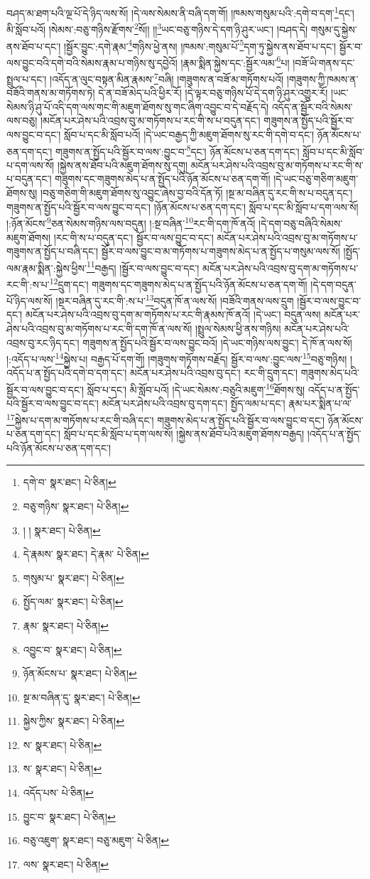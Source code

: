 བཤད་མ་ཐག་པའི་ལྔ་པོ་དེ་ཉིད་ལས་སོ། །དེ་ལས་སེམས་ནི་བཞི་དག་གོ། །ཁམས་གསུམ་པའི་:དགེ་བ་དག་\footnote{དགེ་བ་  སྣར་ཐང་།  པེ་ཅིན། }དང་། མི་སློབ་པའོ། །སེམས་:བཅུ་གཉིས་རྫོགས་\footnote{བཅུ་གཉིས་  སྣར་ཐང་།  པེ་ཅིན། }སོ།། །།\footnote{། །  སྣར་ཐང་།  པེ་ཅིན། }ཡང་བཅུ་གཉིས་དེ་དག་ཉི་ཤུར་ཡང་། །བཤད་དེ། གསུམ་དུ་སྐྱེས་ནས་ཐོབ་པ་དང་། །སྦྱོར་བྱུང་:དགེ་རྣམ་\footnote{དེ་རྣམས་  སྣར་ཐང་། དེ་རྣམ་  པེ་ཅིན། }གཉིས་ཕྱེ་ནས། །ཁམས་:གསུམ་པོ་\footnote{གསུམ་པ་  སྣར་ཐང་།  པེ་ཅིན། }དག་ཏུ་སྐྱེས་ནས་ཐོབ་པ་དང་། སྦྱོར་བ་ལས་བྱུང་བའི་དགེ་བའི་སེམས་རྣམ་པ་གཉིས་སུ་དབྱེའོ། །རྣམ་སྨིན་སྐྱེས་དང་:སྦྱོར་ལམ་\footnote{སྤྱོད་ལམ་  སྣར་ཐང་།  པེ་ཅིན། }པ། །བཟོ་ཡི་གནས་དང་སྤྲུལ་པ་དང་། །འདོད་ན་ལུང་བསྟན་མིན་རྣམས་\footnote{རྣམ་  སྣར་ཐང་།  པེ་ཅིན། }བཞི། །གཟུགས་ན་བཟོ་མ་གཏོགས་པའོ། །གཟུགས་ཀྱི་ཁམས་ན་བཟོའི་གནས་མ་གཏོགས་ཏེ། དེ་ན་བཟོ་མེད་པའི་ཕྱིར་རོ། །དེ་ལྟར་བཅུ་གཉིས་པོ་དེ་དག་ཉི་ཤུར་འགྱུར་རོ། །ཡང་སེམས་ཉི་ཤུ་པོ་འདི་དག་ལས་གང་གི་མཇུག་ཐོགས་སུ་གང་ཞིག་འབྱུང་བ་དེ་བརྗོད་དེ། འདོད་ན་སྦྱོར་བའི་སེམས་ལས་བཅུ། །མངོན་པར་ཤེས་པའི་འབྲས་བུ་མ་གཏོགས་པ་རང་གི་ས་པ་བདུན་དང་། གཟུགས་ན་སྤྱོད་པའི་སྦྱོར་བ་ལས་བྱུང་བ་དང་། སློབ་པ་དང་མི་སློབ་པའོ། །དེ་ཡང་བརྒྱད་ཀྱི་མཇུག་ཐོགས་སུ་རང་གི་དགེ་བ་དང་། ཉོན་མོངས་པ་ཅན་དག་དང་། གཟུགས་ན་སྤྱོད་པའི་སྦྱོར་བ་ལས་:བྱུང་བ་\footnote{འབྱུང་བ་  སྣར་ཐང་།  པེ་ཅིན། }དང་། ཉོན་མོངས་པ་ཅན་དག་དང་། སློབ་པ་དང་མི་སློབ་པ་དག་ལས་སོ། །སྐྱེས་ནས་ཐོབ་པའི་མཇུག་ཐོགས་སུ་དགུ། མངོན་པར་ཤེས་པའི་འབྲས་བུ་མ་གཏོགས་པ་རང་གི་ས་པ་བདུན་དང་། གཟུགས་དང་གཟུགས་མེད་པ་ན་སྤྱོད་པའི་ཉོན་མོངས་པ་ཅན་དག་གོ། །དེ་ཡང་བཅུ་གཅིག་མཇུག་ཐོགས་སུ། །བཅུ་གཅིག་གི་མཇུག་ཐོགས་སུ་འབྱུང་ཞེས་བྱ་བའི་དོན་ཏོ། །སྔ་མ་བཞིན་དུ་རང་གི་ས་པ་བདུན་དང་། གཟུགས་ན་སྤྱོད་པའི་སྦྱོར་བ་ལས་བྱུང་བ་དང་། །ཉོན་མོངས་པ་ཅན་དག་དང་། སློབ་པ་དང་མི་སློབ་པ་དག་ལས་སོ། །:ཉོན་མོངས་\footnote{ཉོན་མོངས་པ་  སྣར་ཐང་།  པེ་ཅིན། }ཅན་སེམས་གཉིས་ལས་བདུན། །:སྔ་བཞིན་\footnote{སྔ་མ་བཞིན་དུ་  སྣར་ཐང་།  པེ་ཅིན། }རང་གི་དག་ཁོ་ནའོ། །དེ་དག་བཅུ་བཞིའི་སེམས་མཇུག་ཐོགས། །རང་གི་ས་པ་བདུན་དང་། སྦྱོར་བ་ལས་བྱུང་བ་དང་། མངོན་པར་ཤེས་པའི་འབྲས་བུ་མ་གཏོགས་པ་གཟུགས་ན་སྤྱོད་པ་བཞི་དང་། སྦྱོར་བ་ལས་བྱུང་བ་མ་གཏོགས་པ་གཟུགས་མེད་པ་ན་སྤྱོད་པ་གསུམ་ལས་སོ། །སྤྱོད་ལམ་རྣམ་སྨིན་:སྐྱེས་ཕྱིས་\footnote{སྐྱེས་ཀྱིས་  སྣར་ཐང་།  པེ་ཅིན། }བརྒྱད། །སྦྱོར་བ་ལས་བྱུང་བ་དང་། མངོན་པར་ཤེས་པའི་འབྲས་བུ་དག་མ་གཏོགས་པ་རང་གི་:ས་པ་\footnote{ས་  སྣར་ཐང་།  པེ་ཅིན། }དྲུག་དང་། གཟུགས་དང་གཟུགས་མེད་པ་ན་སྤྱོད་པའི་ཉོན་མོངས་པ་ཅན་དག་གོ། །དེ་དག་བདུན་པོ་ཉིད་ལས་སོ། །སྔར་བཞིན་དུ་རང་གི་:ས་པ་\footnote{ས་  སྣར་ཐང་།  པེ་ཅིན། }བདུན་ཁོ་ན་ལས་སོ། །བཟོའི་གནས་ལས་དྲུག །སྦྱོར་བ་ལས་བྱུང་བ་དང་། མངོན་པར་ཤེས་པའི་འབྲས་བུ་དག་མ་གཏོགས་པ་རང་གི་རྣམས་ཁོ་ནའོ། །དེ་ཡང་། བདུན་ལས། མངོན་པར་ཤེས་པའི་འབྲས་བུ་མ་གཏོགས་པ་རང་གི་དག་ཁོ་ན་ལས་སོ། །སྤྲུལ་སེམས་ཕྱི་ནས་གཉིས། མངོན་པར་ཤེས་པའི་འབྲས་བུ་རང་ཉིད་དང་། གཟུགས་ན་སྤྱོད་པའི་སྦྱོར་བ་ལས་བྱུང་བའོ། །དེ་ཡང་གཉིས་ལས་བྱུང་། དེ་ཁོ་ན་ལས་སོ། །:འདོད་པ་ལས་\footnote{འདོད་པས་  པེ་ཅིན། }སྐྱེས་པ། བརྒྱད་པོ་དག་གོ། །གཟུགས་གཏོགས་བརྗོད། སྦྱོར་བ་ལས་:བྱུང་ལས་\footnote{བྱུང་བ་  སྣར་ཐང་།  པེ་ཅིན། }བཅུ་གཉིས། །འདོད་པ་ན་སྤྱོད་པའི་དགེ་བ་དག་དང་། མངོན་པར་ཤེས་པའི་འབྲས་བུ་དང་། རང་གི་དྲུག་དང་། གཟུགས་མེད་པའི་སྦྱོར་བ་ལས་བྱུང་བ་དང་། སློབ་པ་དང་། མི་སློབ་པའོ། །དེ་ཡང་སེམས་:བཅུའི་མཇུག་\footnote{བཅུ་འཇུག་  སྣར་ཐང་། བཅུ་མཇུག་  པེ་ཅིན། }ཐོགས་སུ། འདོད་པ་ན་སྤྱོད་པའི་སྦྱོར་བ་ལས་བྱུང་བ་དང་། མངོན་པར་ཤེས་པའི་འབྲས་བུ་དག་དང་། སྤྱོད་ལམ་པ་དང་། རྣམ་པར་སྨིན་པ་ལ་\footnote{ལས་  སྣར་ཐང་།  པེ་ཅིན། }སྐྱེས་པ་དག་མ་གཏོགས་པ་རང་གི་བཞི་དང་། གཟུགས་མེད་པ་ན་སྤྱོད་པའི་སྦྱོར་བ་ལས་བྱུང་བ་དང་། ཉོན་མོངས་པ་ཅན་དག་དང་། སློབ་པ་དང་མི་སློབ་པ་དག་ལས་སོ། །སྐྱེས་ནས་ཐོབ་པའི་མཇུག་ཐོགས་བརྒྱད། །འདོད་པ་ན་སྤྱོད་པའི་ཉོན་མོངས་པ་ཅན་དག་དང་། 